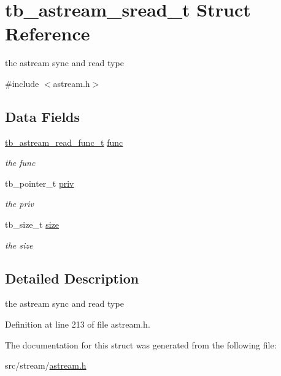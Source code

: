 \hypertarget{structtb__astream__sread__t}{\section{tb\-\_\-astream\-\_\-sread\-\_\-t Struct Reference}
\label{structtb__astream__sread__t}
}


the astream sync and read type  




{\ttfamily \#include $<$astream.\-h$>$}

\subsection*{Data Fields}
\begin{DoxyCompactItemize}
\item 
\hypertarget{structtb__astream__sread__t_a8075685d46a36ff53b82002d225d521d}{\hyperlink{astream_8h_a94c551da39b2f5d59cf37a8154267c00}{tb\-\_\-astream\-\_\-read\-\_\-func\-\_\-t} \hyperlink{structtb__astream__sread__t_a8075685d46a36ff53b82002d225d521d}{func}}\label{structtb__astream__sread__t_a8075685d46a36ff53b82002d225d521d}

\begin{DoxyCompactList}\small\item\em the func \end{DoxyCompactList}\item 
\hypertarget{structtb__astream__sread__t_a4d6fdc0f722ffc6f760c6c3e61b8fb2a}{tb\-\_\-pointer\-\_\-t \hyperlink{structtb__astream__sread__t_a4d6fdc0f722ffc6f760c6c3e61b8fb2a}{priv}}\label{structtb__astream__sread__t_a4d6fdc0f722ffc6f760c6c3e61b8fb2a}

\begin{DoxyCompactList}\small\item\em the priv \end{DoxyCompactList}\item 
\hypertarget{structtb__astream__sread__t_aa15cd2afc6998cbf0146d39cc78f68af}{tb\-\_\-size\-\_\-t \hyperlink{structtb__astream__sread__t_aa15cd2afc6998cbf0146d39cc78f68af}{size}}\label{structtb__astream__sread__t_aa15cd2afc6998cbf0146d39cc78f68af}

\begin{DoxyCompactList}\small\item\em the size \end{DoxyCompactList}\end{DoxyCompactItemize}


\subsection{Detailed Description}
the astream sync and read type 

Definition at line 213 of file astream.\-h.



The documentation for this struct was generated from the following file\-:\begin{DoxyCompactItemize}
\item 
src/stream/\hyperlink{astream_8h}{astream.\-h}\end{DoxyCompactItemize}
